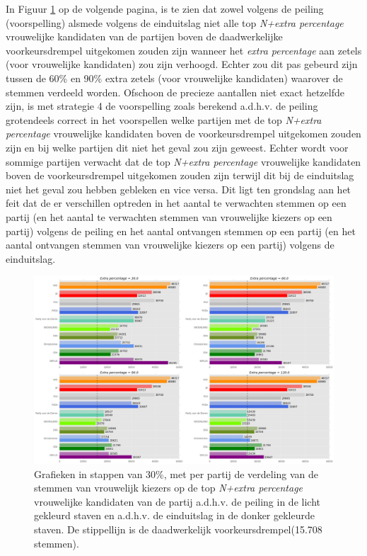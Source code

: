 In Figuur \ref{fig:stemmenS4V} op de volgende pagina, is te zien dat zowel volgens de peiling (voorspelling) alsmede volgens de einduitslag niet alle top \textit{N+extra percentage} vrouwelijke kandidaten van de partijen boven de daadwerkelijke voorkeursdrempel uitgekomen zouden zijn wanneer het \textit{extra percentage} aan zetels (voor vrouwelijke kandidaten) zou zijn verhoogd. Echter zou dit pas gebeurd zijn tussen de 60\%  en 90\% extra zetels (voor vrouwelijke kandidaten) waarover de stemmen verdeeld worden. Ofschoon de precieze aantallen niet exact hetzelfde zijn, is met strategie 4 de voorspelling zoals berekend a.d.h.v. de peiling grotendeels correct in het voorspellen welke partijen met de top \textit{N+extra percentage} vrouwelijke kandidaten boven de voorkeursdrempel uitgekomen zouden zijn en bij welke partijen dit niet het geval zou zijn geweest. Echter wordt voor sommige partijen verwacht dat de top \textit{N+extra percentage} vrouwelijke kandidaten boven de voorkeursdrempel uitgekomen zouden zijn terwijl dit bij de einduitslag niet het geval zou hebben gebleken en vice versa. Dit ligt ten grondslag aan het feit dat de er verschillen optreden in het aantal te verwachten stemmen op een partij (en het aantal te verwachten stemmen van vrouwelijke kiezers op een partij) volgens de peiling en het aantal ontvangen stemmen op een partij (en het aantal ontvangen stemmen van vrouwelijke kiezers op een partij) volgens de einduitslag.

\begin{figure}[H]

	\includegraphics[width=\linewidth]	{stemmen_op_vrouwen_topNextrapercentage_samen.png}

			\caption{Grafieken in stappen van 30\%, met per partij de verdeling van de stemmen van vrouwelijk kiezers op de top \textit{N+extra percentage} vrouwelijke kandidaten van de partij a.d.h.v. de peiling \citep{IPSOS} in de licht gekleurd staven en a.d.h.v. de einduitslag \citep{Kiesraad_databank} in de donker gekleurde staven. De stippellijn is de daadwerkelijk voorkeursdrempel(15.708 stemmen).}

\label{fig:stemmenS4V}
\end{figure}


